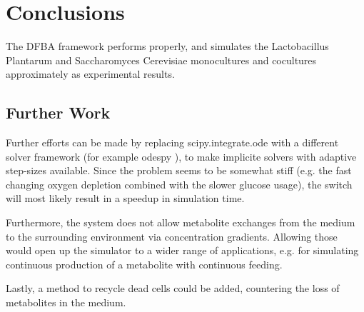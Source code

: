 \section{Conclusions}\label{sec:conclusions}
	The DFBA framework performs properly, and simulates the Lactobacillus Plantarum and Saccharomyces Cerevisiae monocultures and cocultures
	approximately as experimental results.
	\subsection{Further Work}
		Further efforts can be made by replacing scipy.integrate.ode with a
		different solver framework (for example odespy \cite{odespy}), to make implicite solvers with adaptive step-sizes available.
		Since the problem seems to be somewhat stiff (e.g. the fast changing oxygen depletion combined with the slower glucose usage),
		the switch will most likely result in a speedup in simulation time.
		
		Furthermore, the system does not allow metabolite exchanges from the medium to the surrounding environment via concentration gradients.
		Allowing those would open up the simulator to a wider range of applications, e.g. for simulating continuous production of a metabolite with
		continuous feeding.
		
		Lastly, a method to recycle dead cells could be added, countering the loss of metabolites in the medium.
